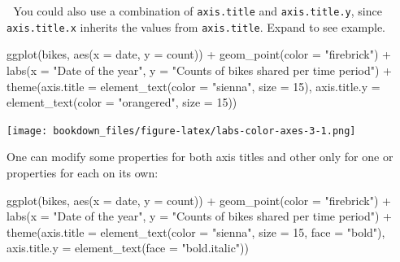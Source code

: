 \documentclass[
]{krantz}
\makeatletter
\newenvironment{Shaded}{\begin{snugshade}}{\end{snugshade}}
\newcommand{\AttributeTok}[1]{\textcolor[rgb]{0.61,0.61,0.61}{#1}}
\newcommand{\DecValTok}[1]{\textcolor[rgb]{0.06,0.06,0.06}{#1}}
\newcommand{\FunctionTok}[1]{\textcolor[rgb]{0,0,0}{#1}}
\newcommand{\NormalTok}[1]{#1}
\newcommand{\SpecialCharTok}[1]{\textcolor[rgb]{0,0,0}{#1}}
\newcommand{\StringTok}[1]{\textcolor[rgb]{0.5,0.5,0.5}{#1}}
\newenvironment{kframe}{%
\medskip{}
\setlength{\fboxsep}{.8em}
 \def\at@end@of@kframe{}%
 \ifinner\ifhmode%
  \def\at@end@of@kframe{\end{minipage}}%
  \begin{minipage}{\columnwidth}%
 \fi\fi%
 \def\FrameCommand##1{\hskip\@totalleftmargin \hskip-\fboxsep
 \colorbox{shadecolor}{##1}\hskip-\fboxsep
     \hskip-\linewidth \hskip-\@totalleftmargin \hskip\columnwidth}%
 \MakeFramed {\advance\hsize-\width
   \@totalleftmargin\z@ \linewidth\hsize
   \@setminipage}}%
 {\par\unskip\endMakeFramed%
 \at@end@of@kframe}
\renewenvironment{Shaded}{\begin{kframe}}{\end{kframe}}
\makeatother
\begin{document}
💁 You could also use a combination of \texttt{axis.title} and \texttt{axis.title.y}, since \texttt{axis.title.x} inherits the values from \texttt{axis.title}. Expand to see example.

\begin{Shaded}
\begin{Highlighting}[]
\FunctionTok{ggplot}\NormalTok{(bikes, }\FunctionTok{aes}\NormalTok{(}\AttributeTok{x =}\NormalTok{ date, }\AttributeTok{y =}\NormalTok{ count)) }\SpecialCharTok{+}
  \FunctionTok{geom\_point}\NormalTok{(}\AttributeTok{color =} \StringTok{"firebrick"}\NormalTok{) }\SpecialCharTok{+}
  \FunctionTok{labs}\NormalTok{(}\AttributeTok{x =} \StringTok{"Date of the year"}\NormalTok{, }
       \AttributeTok{y =} \StringTok{"Counts of bikes shared per time period"}\NormalTok{) }\SpecialCharTok{+}
  \FunctionTok{theme}\NormalTok{(}\AttributeTok{axis.title =} \FunctionTok{element\_text}\NormalTok{(}\AttributeTok{color =} \StringTok{"sienna"}\NormalTok{, }\AttributeTok{size =} \DecValTok{15}\NormalTok{),}
        \AttributeTok{axis.title.y =} \FunctionTok{element\_text}\NormalTok{(}\AttributeTok{color =} \StringTok{"orangered"}\NormalTok{, }\AttributeTok{size =} \DecValTok{15}\NormalTok{))}
\end{Highlighting}
\end{Shaded}

\texttt{[image: bookdown\_files/figure-latex/labs-color-axes-3-1.png]}

One can modify some properties for both axis titles and other only for one or properties for each on its own:

\begin{Shaded}
\begin{Highlighting}[]
\FunctionTok{ggplot}\NormalTok{(bikes, }\FunctionTok{aes}\NormalTok{(}\AttributeTok{x =}\NormalTok{ date, }\AttributeTok{y =}\NormalTok{ count)) }\SpecialCharTok{+}
  \FunctionTok{geom\_point}\NormalTok{(}\AttributeTok{color =} \StringTok{"firebrick"}\NormalTok{) }\SpecialCharTok{+}
  \FunctionTok{labs}\NormalTok{(}\AttributeTok{x =} \StringTok{"Date of the year"}\NormalTok{, }
       \AttributeTok{y =} \StringTok{"Counts of bikes shared per time period"}\NormalTok{) }\SpecialCharTok{+}
  \FunctionTok{theme}\NormalTok{(}\AttributeTok{axis.title =} \FunctionTok{element\_text}\NormalTok{(}\AttributeTok{color =} \StringTok{"sienna"}\NormalTok{, }\AttributeTok{size =} \DecValTok{15}\NormalTok{, }\AttributeTok{face =} \StringTok{"bold"}\NormalTok{),}
        \AttributeTok{axis.title.y =} \FunctionTok{element\_text}\NormalTok{(}\AttributeTok{face =} \StringTok{"bold.italic"}\NormalTok{))}
\end{Highlighting}
\end{Shaded}
\end{document}
